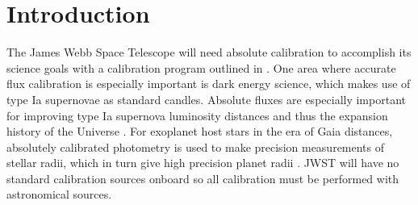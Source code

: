 \documentclass{aastex6}
\begin{document}





\section{Introduction}

The James Webb Space Telescope \citep[JWST; e.g.][]{gardner2006SSRv} will need absolute calibration to accomplish its science goals with a calibration program outlined in \citet{gordon2022absFlux1}.
One area where accurate flux calibration is especially important is dark energy science, which makes use of type Ia supernovae as standard candles.
Absolute fluxes are especially important for improving type Ia supernova luminosity distances and thus the expansion history of the Universe \citep[e.g.][]{narayan2016wdnetwork,betoule2014cosmologySN}.
For exoplanet host stars in the era of Gaia distances, absolutely calibrated photometry is used to make precision measurements of stellar radii, which in turn give high precision planet radii \citep[e.g.][]{stassun2017gaiaRadiiMasses}.
JWST will have no standard calibration sources onboard so all calibration must be performed with astronomical sources.
\end{document}
